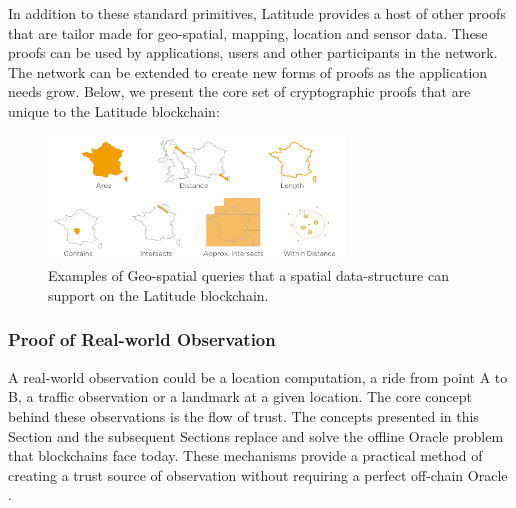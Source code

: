 %

In addition to these standard primitives, Latitude provides a host of other proofs that are tailor made
for geo-spatial, mapping, location and sensor data. These proofs can be used by applications, users and
other participants in the network. The network can be extended to create new forms of proofs as the application needs
grow. Below, we present the core set of cryptographic proofs that are unique to the Latitude blockchain:

\begin{figure}[t]
    \centering
    \includegraphics[width=0.70\textwidth]{geospatial_query.png}
  \caption{Examples of Geo-spatial queries that a spatial data-structure can support on the Latitude blockchain.}
    \label{fig:geo_spatial_query}
\end{figure}

\subsubsection{Proof of Real-world Observation}

A real-world observation could be a location computation, a ride from point A to B, a traffic observation or a landmark
at a given location. The core concept behind these observations is the flow of trust. The concepts presented in this
Section and the subsequent Sections replace and solve the offline Oracle problem that blockchains face today. These
mechanisms provide a practical method of creating a trust source of observation without requiring a perfect off-chain
Oracle \cite{concurrence}.

